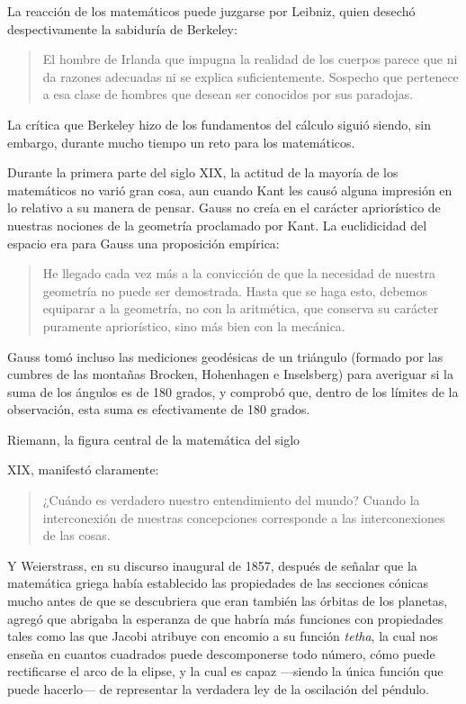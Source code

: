 \documentclass[a4paper, 12pt]{article}
\begin{document}
{La reacción de los matemáticos puede juzgarse por Leibniz, quien desechó
despectivamente la sabiduría de Berkeley:

\begin{quote}\small El hombre de Irlanda que impugna la realidad de los cuerpos
parece que ni da razones adecuadas ni se explica suficientemente. Sospecho que
pertenece a esa clase de hombres que desean ser conocidos por sus paradojas.
\end{quote}

La crítica que Berkeley hizo de los fundamentos del cálculo siguió siendo, sin
embargo, durante mucho tiempo un reto para los matemáticos.

Durante la primera parte del siglo XIX, la actitud de la mayoría de los
matemáticos no varió gran cosa, aun cuando Kant les causó alguna impresión en lo
relativo a su manera de pensar. Gauss no creía en el carácter apriorístico de
nuestras nociones de la geometría proclamado por Kant. La euclidicidad del
espacio era para Gauss una proposición empírica:

\begin{quote}\small He llegado cada vez más a la convicción de que la necesidad
de nuestra geometría no puede ser demostrada. Hasta que se haga esto, debemos
equiparar a la geometría, no con la aritmética, que conserva su carácter
puramente apriorístico, sino más bien con la mecánica. \end{quote}

Gauss tomó incluso las mediciones geodésicas de un triángulo (formado por las
cumbres de las montañas Brocken, Hohenhagen e Inselsberg) para averiguar si la
suma de los ángulos es de 180 grados, y comprobó que, dentro de los límites de
la observación, esta suma es efectivamente de 180 grados.

Riemann, la figura central de la matemática del siglo {XIX, manifestó
claramente:

\begin{quote}\small ¿Cuándo es verdadero nuestro entendimiento del mundo? Cuando
la interconexión  de nuestras concepciones  corresponde a las interconexiones de
las cosas. \end{quote}

Y Weierstrass, en su discurso inaugural de 1857, después de señalar que la
matemática griega había establecido las propiedades de las secciones cónicas
mucho antes de que se descubriera que eran también las órbitas de los planetas,
agregó que abrigaba la esperanza de que habría más funciones con propiedades
tales como las que Jacobi atribuye con encomio a su función \textit{tetha}, la
cual nos enseña en cuantos cuadrados puede descomponerse todo número, cómo puede
rectificarse el arco de la elipse, y la cual es capaz \mbox{---siendo} la única
función que puede hacerlo--- de representar la verdadera ley de la oscilación
del péndulo.

}}
\end{document}
